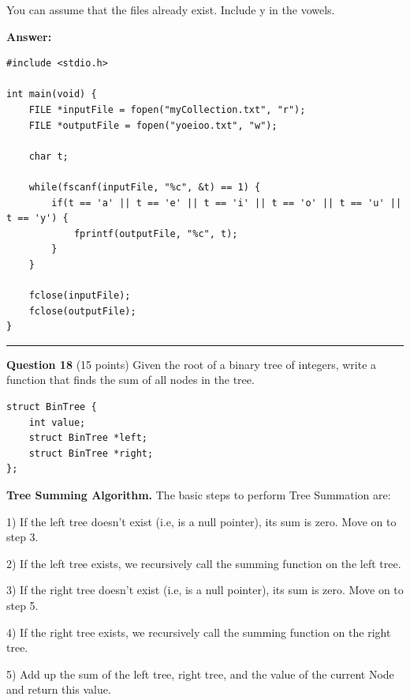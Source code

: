 \documentclass{exam}
\begin{document}
You can assume that the files already exist. Include y in the vowels.

\textbf{Answer:}

\begin{lstlisting}
#include <stdio.h>

int main(void) {
	FILE *inputFile = fopen("myCollection.txt", "r");
	FILE *outputFile = fopen("yoeioo.txt", "w");

	char t;
	
	while(fscanf(inputFile, "%c", &t) == 1) {
		if(t == 'a' || t == 'e' || t == 'i' || t == 'o' || t == 'u' || t == 'y') {
			fprintf(outputFile, "%c", t);
		}
	}

	fclose(inputFile);
	fclose(outputFile);
}
\end{lstlisting}

\newpage




\begin{center}\noindent\rule{6in}{0.4pt}\end{center}

\textbf{Question 18} (15 points) Given the root of a binary tree of integers, write a function that finds the sum of all nodes in the tree.

\begin{lstlisting}
struct BinTree {
	int value;
	struct BinTree *left;
	struct BinTree *right;
};
\end{lstlisting}

\textbf{Tree Summing Algorithm.} The basic steps to perform Tree Summation are:

1) If the left tree doesn't exist (i.e, is a null pointer), its sum is zero. Move on to step 3.

2) If the left tree exists, we recursively call the summing function on the left tree.

3) If the right tree doesn't exist (i.e, is a null pointer), its sum is zero. Move on to step 5.

4) If the right tree exists, we recursively call the summing function on the right tree.

5) Add up the sum of the left tree, right tree, and the value of the current Node and return this value.
\end{document}
